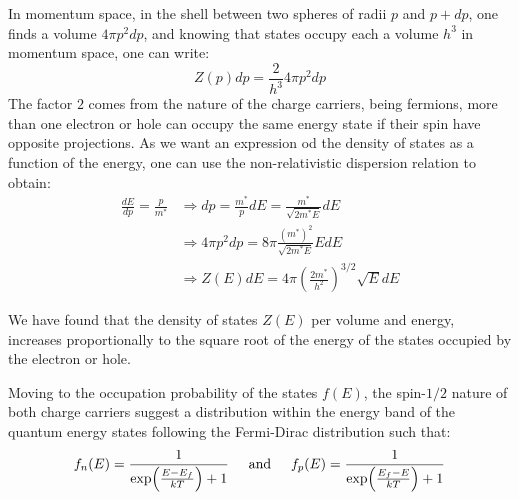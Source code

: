 		In momentum space, in the shell between two spheres of radii $p$ and $p + dp$, one finds a volume $4\pi p^2 dp$, and knowing that states occupy each a volume $h^3$ in momentum space, one can write: 
		\begin{equation}
			Z(p) dp = \frac{2}{h^3} 4 \pi p^2dp
		\end{equation}
		The factor $2$ comes from the nature of the charge carriers, being fermions, more than one electron or hole can occupy the same energy state if their spin have opposite projections. As we want an expression od the density of states as a function of the energy, one can use the non-relativistic dispersion relation to obtain: 
		\begin{equation}
			\begin{split}
				\frac{dE}{dp} = \frac{p}{m^*} &\Rightarrow dp = \frac{m^*}{p} dE = \frac{m^*}{\sqrt{2m^*E}}dE\\
																			&\Rightarrow 4\pi p^2 dp = 8 \pi \frac{(m^*)^2}{\sqrt{2m^*E}}EdE\\
																			&\Rightarrow Z(E)dE = 4 \pi{ \left( \frac{2m^*}{h^2} \right)}^{3/2} \sqrt{E} dE
			\end{split}
		\end{equation}

		We have found that the density of states $Z(E)$ per volume and energy, increases proportionally to the square root of the energy of the states occupied by the electron or hole. 

		Moving to the occupation probability of the states $f(E)$, the spin-$1/2$ nature of both charge carriers suggest a distribution within the energy band of the quantum energy states following the Fermi-Dirac distribution such that: 
		\begin{equation}
			f_n(E) = \frac{1}{\exp(\frac{E-E_f}{kT}) + 1} \hspace{5mm} \text{and} \hspace{5mm} f_p(E) = \frac{1}{\exp(\frac{E_f-E}{kT}) + 1}
			\label{eq:FermiDirac}
		\end{equation}

